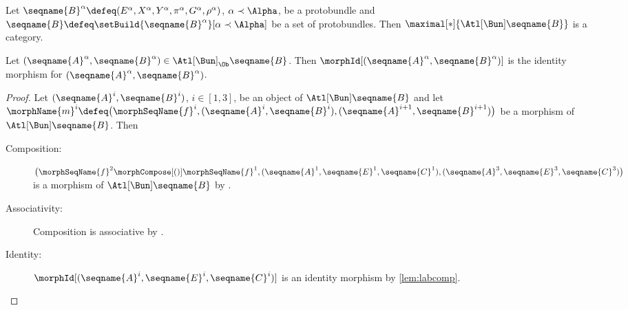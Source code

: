 \documentclass{article}
\begin{document}
\begin{lemma}
\label{lem:Bun-ATLiscat}
Let
$
  \seqname{B}^\alpha \defeq
  (E^\alpha, X^\alpha, Y^\alpha, \pi^\alpha, G^\alpha, \rho^\alpha)
$,
$\alpha \prec \Alpha$, be a protobundle and
$\seqname{B} \defeq \setBuild{{\seqname{B}^\alpha}}[\alpha \prec \Alpha]$
be a set of protobundles.
Then $\maximal[*]{\Atl[\Bun] \seqname{B}}$ is a category.

Let
$
  (\seqname{A}^\alpha, \seqname{B}^\alpha)
  \in
  \Atl[\Bun]_\Ob \seqname{B}
$.
Then $\morphId[{{(\seqname{A}^\alpha, \seqname{B}^\alpha)}}]$ is the
identity morphism for $(\seqname{A}^\alpha, \seqname{B}^\alpha)$.

\begin{proof}
Let $(\seqname{A}^i,\seqname{B}^i)$, $i \in [1,3]$,
be an object of $\Atl[\Bun] \seqname{B}$ and
let \\
$
  \morphName{m}^i \defeq
  \bigl (
    \morphSeqName{f}^i,
    (\seqname{A}^i,\seqname{B}^i),
    (\seqname{A}^{i+1},\seqname{B}^{i+1})
  \bigr )
$
be a morphism of $\Atl[\Bun] \seqname{B}$. Then
\begin{description}
\item[Composition:]
$
  \bigl (
    \morphSeqName{f}^2 \morphCompose[()] \morphSeqName{f}^1,
    (\seqname{A}^1,\seqname{E}^1,\seqname{C}^1),
    (\seqname{A}^3,\seqname{E}^3,\seqname{C}^3)
  \bigr )
$
is a morphism of $\Atl[\Bun] \seqname{B}$ by
.

\item[Associativity:]
Composition is associative by .

\item[Identity:]
$\morphId[{{(\seqname{A}^i, \seqname{E}^i, \seqname{C}^i)}}]$ is an identity
morphism by \cref{lem:labcomp}.
\end{description}
\end{proof}
\end{lemma}
\end{document}
